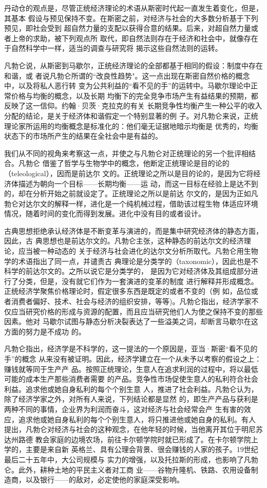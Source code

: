 丹动仓的观点是，尽管正统经济理论的术语从斯密时代起一直发生着变化，但是，其基本
假设与预见保持不变。在斯密之前，对经济与社会的大多数分析基于下列预见，即社会受到
超自然力量的支配以获得合意的结果。后来，对超自然力量或者上帝的求助，被下列观点所
取代，即自然法则存在于经济和社会中，就像存在于自然科学中一样，适当的调查与研究将
揭示这些自然法则的运转。

凡勃仑说，从斯密到马歇尔，正统经济理论的全部都基于相同的假设：制度中存在和谐，或
者说凡勃仑所谓的“改良性趋势"。这一点出现在斯密自然价格的概念中，以及将私人恶行转
变为公共利益的“看不见的手”的运转中。马歇尔理论中正常价格与均衡的概念，以及长期
均衡下的完全竞争市场产生有益结果的预期，都反映了这一信仰。约翰·贝茨·克拉克的有关
长期竞争性均衡产生一种公平的收入分配的结论，是关于经济体和谐假定一个特别显著的例
子。对凡勃仑来说，正统理论家所运用的均衡概念是标准化的：他们毫无证据地暗示均衡是
优秀的，均衡状态下的市场所产生的结果在全社会中是有益的。

我们从不同的视角来考察这一点，并使之与凡勃仑对正统理论的另一个批评相结合。凡勃仑
借鉴了哲学与生物学中的概念，他断定正统理论是目的论的（teleological），因而是前达尔
文的。正统理论之所以是目的论的，是因为它将经济体描述为朝向一个目标——长期均衡——运
动，而这一目标在经验上是达不到的，却在分析开始之前就设定了。正统理论之所以是前达
尔文的，是因为正如凡勃仑对达尔文的解释一样，进化是一个纯机械过程，借助该过程生物
体适应环境情况，随着时间的变化而得到发展。进化中没有目的或者设计。

古典思想拒绝承认经济体是不断变革与演进的，而是集中研究经济体的静态方面，因此，古
典思想也是前达尔文的。凡勃仑主张，这种静态的前达尔文的经济理论，应当被一种动态的
关于经济与社会进化的达尔文分析所取代。凡勃仑用生物学的术语指出了同一点，并谴责古
典理论是分类学的（taxonomic），因此也是不科学的前达尔文的。之所以说它是分类学的，
是因为它对经济体及其组成部分进行了分类，但是，没有就它们作为一套演进的变革的制度
进行解释并形成概念。正统经济学聚焦价格理论时，假定很多东西是既定的或者不变的（例
如，品位或者消费者偏好、技术、社会与经济的组织安排，等等)。凡勃仑指出，经济学家不
仅应当研究价格的形成与资源的配置，而且应当研究他们人为使之保持不变的那些因素。他对
马歇尔试图与静态分析决裂表达了一些溢美之词，却断言马歇尔在这方面的努力是不成功
的。

凡勃仑指出，经济学是不科学的，这一提法的一个原因是，亚当·斯密“看不见的手”的概念
从来没有被证明。因此，经济学建立在一个从未予以考察的假设之上：赚钱就等同于生产产
品。按照正统理论，生意人在追求利润的过程中，将以最低可能的成本生产那些消费者需要
的产品。竞争性市场促使生意人的私利符合社会利益。追求他或她自身私利的每个个别生意
人，推进了社会利益。凡勃仑认为，除了经济学家之外，对所有人来说，下列结论都是显然
的，即生产产品与获利是两种不同的事情，企业界为利润而奋斗，这对经济与社会经常会产
生有害的效应，追求他或她自身私利的每个个别生意人，将只推进他或她自身的私利。有人
提出，凡勃仑对经济与社会的这种观念，在他年轻的时候，当他离开其位于明尼苏达州路德
教会家庭的边境农场，前往卡尔顿学院时就已形成了。在卡尔顿学院上学的，主要是来自新
英格兰、具有公理会背景、很会赚钱的人家的孩子。19世纪最后二十五年中，大公司规模与
实力的增强，以及托拉斯的形成，也影响了凡勃仑。此外，耕种土地的平民主义者对工商
业——谷物升隆机、铁路、农用设备制造商，以及银行——的敌对，必定使他的家庭深受影响。

